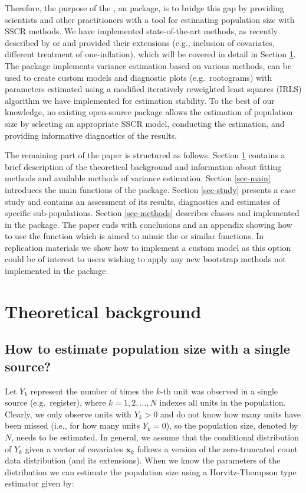 \documentclass[
]{jss}
\newcommand{\1}{\mathcal{I}} \newcommand{\bZero}{\boldsymbol{0}}
\begin{document}
Therefore, the purpose of the , an 
package, is to bridge this gap by providing scientists and other
practitioners with a tool for estimating population size with SSCR
methods. We have implemented state-of-the-art methods, as recently
described by \citet{bohning2018capture} or \citet{bohning2024one} and
provided their extensions (e.g., inclusion of covariates, different
treatment of one-inflation), which will be covered in detail in Section
\ref{sec-theory}. The package implements variance estimation based on
various methods, can be used to create custom models and diagnostic
plots (e.g.~rootograms) with parameters estimated using a modified
iteratively reweighted least squares (IRLS) algorithm we have
implemented for estimation stability. To the best of our knowledge, no
existing open-source package allows the estimation of population size by
selecting an appropriate SSCR model, conducting the estimation, and
providing informative diagnostics of the results.

The remaining part of the paper is structured as follows. Section
\ref{sec-theory} contains a brief description of the theoretical
background and information about fitting methods and available methods
of variance estimation. Section \ref{sec-main} introduces the main
functions of the package. Section \ref{sec-study} presents a case study
and contains an assessment of its results, diagnostics and estimates of
specific sub-populations. Section \ref{sec-methods} describes classes
and  implemented in the package. The paper ends with
conclusions and an appendix showing how to use the
 function which is aimed to mimic the
 or similar functions. In replication materials we show
how to implement a custom model as this option could be of interest to
users wishing to apply any new bootstrap methods not implemented in the
package.

\section{Theoretical background}\label{sec-theory}

\subsection{How to estimate population size with a single
source?}\label{how-to-estimate-population-size-with-a-single-source}

Let \(Y_{k}\) represent the number of times the \(k\)-th unit was
observed in a single source (e.g.~register), where
\(k = 1, 2, \ldots, N\) indexes all units in the population. Clearly, we
only observe units with \(Y_{k} > 0\) and do not know how many units
have been missed (i.e., for how many units \(Y_{k} = 0\)), so the
population size, denoted by \(N\), needs to be estimated. In general, we
assume that the conditional distribution of \(Y_{k}\) given a vector of
covariates \(\boldsymbol{x}_{k}\) follows a version of the
zero-truncated count data distribution (and its extensions). When we
know the parameters of the distribution we can estimate the population
size using a Horvitz-Thompson type estimator given by:
\end{document}
